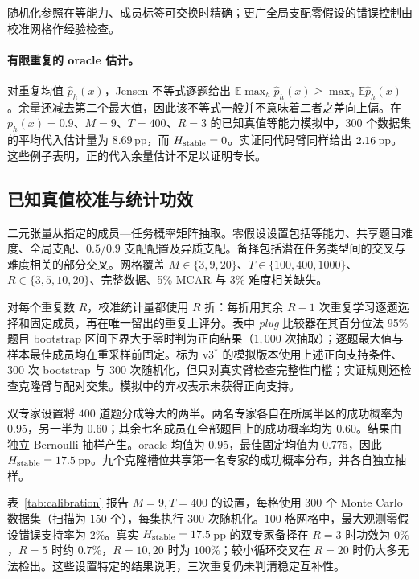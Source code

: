 随机化参照在等能力、成员标签可交换时精确；更广全局支配零假设的错误控制由校准网格作经验检查。

\paragraph{有限重复的 oracle 估计。}
对重复均值 $\hat p_h(x)$，Jensen 不等式逐题给出 $\mathbb E\max_h\hat p_h(x)\ge\max_h\mathbb E\hat p_h(x)$。余量还减去第二个最大值，因此该不等式一般并不意味着二者之差向上偏。在 $p_h(x)=0.9$、$M=9$、$T=400$、$R=3$ 的已知真值等能力模拟中，$300$ 个数据集的平均代入估计量为 $8.69$\,pp，而 $H_{\rm stable}=0$。实证同代码臂同样给出 $2.16$\,pp。这些例子表明，正的代入余量估计不足以证明专长。

\subsection{已知真值校准与统计功效}
二元张量从指定的成员—任务概率矩阵抽取。零假设设置包括等能力、共享题目难度、全局支配、$0.5/0.9$ 支配配置及异质支配。备择包括潜在任务类型间的交叉与难度相关的部分交叉。网格覆盖 $M\in\{3,9,20\}$、$T\in\{100,400,1000\}$、$R\in\{3,5,10,20\}$、完整数据、5\% MCAR 与 3\% 难度相关缺失。

对每个重复数 $R$，校准统计量都使用 $R$ 折：每折用其余 $R-1$ 次重复学习逐题选择和固定成员，再在唯一留出的重复上评分。表中 \emph{plug} 比较器在其百分位法 95\% 题目 bootstrap 区间下界大于零时判为正向结果（$1{,}000$ 次抽取）；逐题最大值与样本最佳成员均在重采样前固定。标为 v3$^\ast$ 的模拟版本使用上述正向支持条件、$300$ 次 bootstrap 与 $300$ 次随机化，但只对真实臂检查完整性门槛；实证规则还检查克隆臂与配对交集。模拟中的弃权表示未获得正向支持。

双专家设置将 $400$ 道题分成等大的两半。两名专家各自在所属半区的成功概率为 $0.95$，另一半为 $0.60$；其余七名成员在全部题目上的成功概率均为 $0.60$。结果由独立 Bernoulli 抽样产生。oracle 均值为 $0.95$，最佳固定均值为 $0.775$，因此 $H_{\rm stable}=17.5$\,pp。九个克隆槽位共享第一名专家的成功概率分布，并各自独立抽样。

表~\ref{tab:calibration} 报告 $M=9,T=400$ 的设置，每格使用 $300$ 个 Monte Carlo 数据集（扫描为 $150$ 个），每集执行 $300$ 次随机化。$100$ 格网格中，最大观测零假设错误支持率为 $2\%$。真实 $H_{\rm stable}=17.5$\,pp 的双专家备择在 $R=3$ 时功效为 $0\%$，$R=5$ 时约 $0.7\%$，$R=10,20$ 时为 $100\%$；较小循环交叉在 $R=20$ 时仍大多无法检出。这些设置特定的结果说明，三次重复仍未判清稳定互补性。

\begin{table}[H]
\centering\small

\caption{\textbf{三次重复甚至会漏掉强正例。}在 $M=9,T=400$ 下，零假设行报告错误支持率（\%），备择行报告功效（\%）；最后一列为 $R=3$ 的弃权率。模拟版克隆校准规则（v3$^\ast$）在稳定互补性为零时很少误判为正向支持，但对所测小、中等交叉的灵敏度很低。}
\label{tab:calibration}
\end{table}

